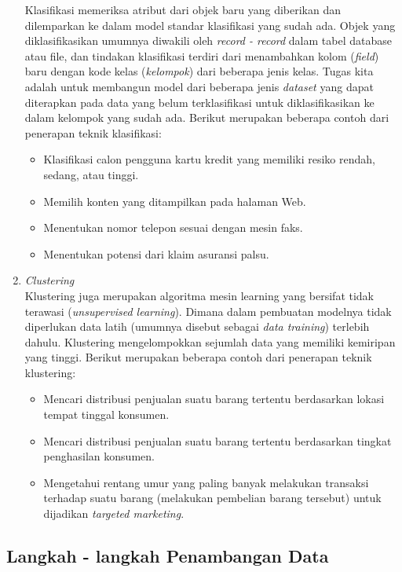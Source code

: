 \begin{enumerate}
	Klasifikasi memeriksa atribut dari objek baru yang diberikan dan dilemparkan ke dalam model standar klasifikasi yang sudah ada. Objek yang diklasifikasikan umumnya diwakili oleh \textit{record - record} dalam tabel database atau file, dan tindakan klasifikasi terdiri dari menambahkan kolom (\textit{field}) baru dengan kode kelas (\textit{kelompok}) dari beberapa jenis kelas. Tugas kita adalah untuk membangun model dari beberapa jenis \textit{dataset} yang dapat diterapkan pada data yang belum terklasifikasi untuk diklasifikasikan ke dalam kelompok yang sudah ada. Berikut merupakan beberapa contoh dari penerapan teknik klasifikasi:
\begin{itemize}
	\item Klasifikasi calon pengguna kartu kredit yang memiliki resiko rendah, sedang, atau tinggi.
	\item Memilih konten yang ditampilkan pada halaman Web.
	\item Menentukan nomor telepon sesuai dengan mesin faks.
	\item Menentukan potensi dari klaim asuransi palsu.
\end{itemize}
	\item{\textit{Clustering}\cite{book:339389}} \\
	Klustering juga merupakan algoritma mesin learning yang bersifat tidak terawasi (\textit{unsupervised learning}). Dimana dalam pembuatan modelnya tidak diperlukan data latih (umumnya disebut sebagai \textit{data training}) terlebih dahulu. Klustering mengelompokkan sejumlah data yang memiliki kemiripan yang tinggi. Berikut merupakan beberapa contoh dari penerapan teknik klustering:
\begin{itemize}
	\item Mencari distribusi penjualan suatu barang tertentu berdasarkan lokasi tempat tinggal konsumen.
	\item Mencari distribusi penjualan suatu barang tertentu berdasarkan tingkat penghasilan konsumen.
	\item Mengetahui rentang umur yang paling banyak melakukan transaksi terhadap suatu barang (melakukan pembelian barang tersebut) untuk dijadikan \textit{targeted marketing}.
\end{itemize}
\end{enumerate}

\subsection{Langkah - langkah Penambangan Data}

